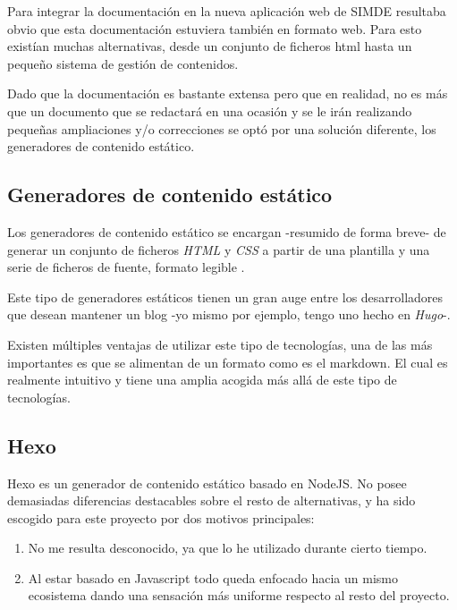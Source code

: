 Para integrar la documentación en la nueva aplicación web de SIMDE resultaba obvio que esta documentación
estuviera también en formato web. Para esto existían muchas alternativas, desde un conjunto de ficheros
html hasta un pequeño sistema de gestión de contenidos. 

\bigskip
Dado que la documentación es bastante extensa pero que en realidad, no es más que un documento 
que se redactará en una ocasión y se le irán realizando pequeñas ampliaciones y/o correcciones
se optó por una solución diferente, los generadores de contenido estático.

\subsection{Generadores de contenido estático}

Los generadores de contenido estático se encargan -resumido de forma breve- de generar 
un conjunto de ficheros \textit{HTML} y \textit{CSS} a partir de una plantilla y una serie 
de ficheros de fuente, formato legible . \cite{GeneradoresEstaticos}

\bigskip
Este tipo de generadores estáticos tienen un gran auge entre los desarrolladores que desean 
mantener un blog -yo mismo por ejemplo, tengo uno hecho en \textit{Hugo}-. 

\bigskip 
Existen múltiples ventajas de utilizar este tipo de tecnologías, una de las más importantes
 es que se alimentan de un formato como es el markdown. El cual es realmente intuitivo 
 y tiene una amplia acogida más allá de este tipo de tecnologías. 

\subsection{Hexo}

Hexo es un generador de contenido estático basado en NodeJS. \cite{Hexo} No posee demasiadas diferencias destacables
sobre el resto de alternativas, y ha sido escogido para este proyecto por dos motivos principales: 

\begin{enumerate}

\item No me resulta desconocido, ya que lo he utilizado durante cierto tiempo.

\item Al estar basado en Javascript todo queda enfocado hacia un mismo ecosistema dando una sensación
más uniforme respecto al resto del proyecto.

\end{enumerate}